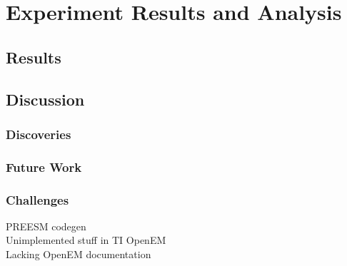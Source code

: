 \chapter{Experiment Results and Analysis}
\label{chapter:results-and-analysis}

\section{Results}
\label{sec:results}


\section{Discussion}
\label{sec:discussion}


\subsection{Discoveries}
\label{subsec:discoveries}

\subsection{Future Work}
\label{subsec:future-work}

\subsection{Challenges}
\label{subsec:challenges}
PREESM codegen \\
Unimplemented stuff in TI OpenEM \\
Lacking OpenEM documentation

